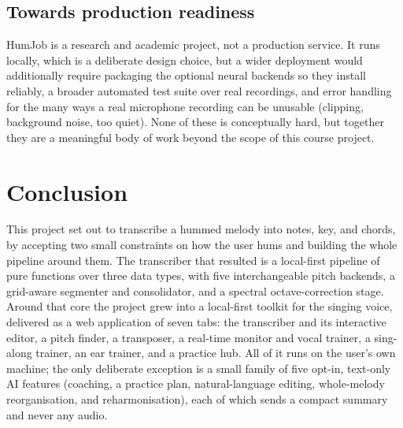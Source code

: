 \documentclass[12pt,a4paper]{article}
\begin{document}
\subsection{Towards production readiness}

HumJob is a research and academic project, not a production service. It runs
locally, which is a deliberate design choice, but a wider deployment would
additionally require packaging the optional neural backends so they install
reliably, a broader automated test suite over real recordings, and error
handling for the many ways a real microphone recording can be unusable (clipping,
background noise, too quiet). None of these is conceptually hard, but together
they are a meaningful body of work beyond the scope of this course project.

\section{Conclusion}

This project set out to transcribe a hummed melody into notes, key, and chords,
by accepting two small constraints on how the user hums and building the whole
pipeline around them. The transcriber that resulted is a local-first pipeline of
pure functions over three data types, with five interchangeable pitch backends, a
grid-aware segmenter and consolidator, and a spectral octave-correction stage.
Around that core the project grew into a local-first toolkit for the singing
voice, delivered as a web application of seven tabs: the transcriber and its
interactive editor, a pitch finder, a transposer, a real-time monitor and vocal
trainer, a sing-along trainer, an ear trainer, and a practice hub. All of it runs
on the user's own machine; the only deliberate exception is a small family of
five opt-in, text-only AI features (coaching, a practice plan, natural-language
editing, whole-melody reorganisation, and reharmonisation), each of which sends a
compact summary and never any audio.
\end{document}
